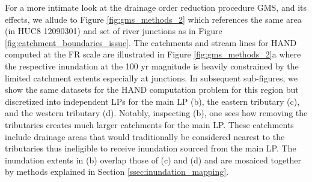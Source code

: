 \documentclass[draft]{dependencies/agujournal2019}
\begin{document}
For a more intimate look at the drainage order reduction procedure GMS, and its effects, we allude to Figure \ref{fig:gms_methods_2} which references the same area (in HUC8 12090301) and set of river junctions as in Figure \ref{fig:catchment_boundaries_issue}.
The catchments and stream lines for HAND computed at the FR scale are illustrated in Figure \ref{fig:gms_methods_2}a where the respective inundation at the 100 yr magnitude is heavily constrained by the limited catchment extents especially at junctions.
In subsequent sub-figures, we show the same datasets for the HAND computation problem for this region but discretized into independent LPs for the main LP (b), the eastern tributary (c), and the western tributary (d).
Notably, inspecting (b), one sees how removing the tributaries creates much larger catchments for the main LP. 
These catchments include drainage areas that would traditionally be considered nearest to the tributaries thus ineligible to receive inundation sourced from the main LP.
The inundation extents in (b) overlap those of (c) and (d) and are mosaiced together by methods explained in Section \ref{ssec:inundation_mapping}.
%
\end{document}
